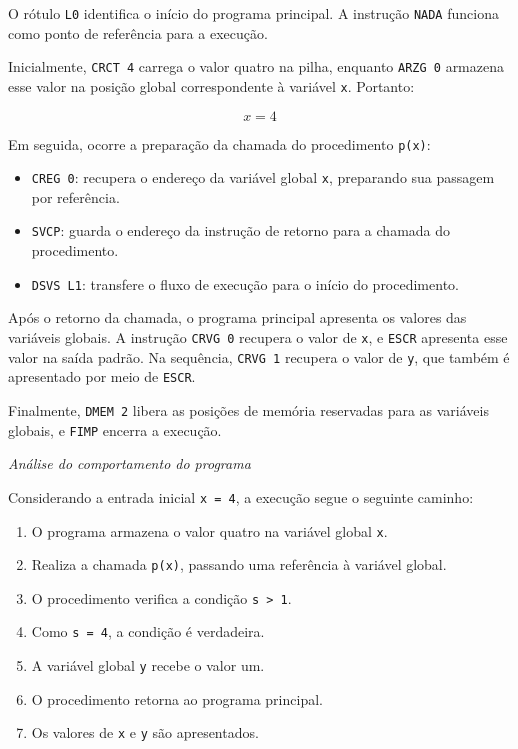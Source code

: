 \documentclass[
  brazilian,
  letterpaper,
]{book}
\providecommand{\tightlist}{%
  \setlength{\itemsep}{0pt}\setlength{\parskip}{0pt}}
\theoremstyle{plain}
\theoremstyle{definition}
\theoremstyle{remark}
\begin{document}
O rótulo \texttt{L0} identifica o início do programa principal. A
instrução \texttt{NADA} funciona como ponto de referência para a
execução.

Inicialmente, \texttt{CRCT\ 4} carrega o valor quatro na pilha, enquanto
\texttt{ARZG\ 0} armazena esse valor na posição global correspondente à
variável \texttt{x}. Portanto:

\[ x=4\]

Em seguida, ocorre a preparação da chamada do procedimento
\texttt{p(x)}:

\begin{itemize}
\tightlist
\item
  \texttt{CREG\ 0}: recupera o endereço da variável global \texttt{x},
  preparando sua passagem por referência.
\item
  \texttt{SVCP}: guarda o endereço da instrução de retorno para a
  chamada do procedimento.
\item
  \texttt{DSVS\ L1}: transfere o fluxo de execução para o início do
  procedimento.
\end{itemize}

Após o retorno da chamada, o programa principal apresenta os valores das
variáveis globais. A instrução \texttt{CRVG\ 0} recupera o valor de
\texttt{x}, e \texttt{ESCR} apresenta esse valor na saída padrão. Na
sequência, \texttt{CRVG\ 1} recupera o valor de \texttt{y}, que também é
apresentado por meio de \texttt{ESCR}.

Finalmente, \texttt{DMEM\ 2} libera as posições de memória reservadas
para as variáveis globais, e \texttt{FIMP} encerra a execução.

\emph{Análise do comportamento do programa}

Considerando a entrada inicial \texttt{x\ =\ 4}, a execução segue o
seguinte caminho:

\begin{enumerate}
\def\labelenumi{\arabic{enumi}.}
\tightlist
\item
  O programa armazena o valor quatro na variável global \texttt{x}.
\item
  Realiza a chamada \texttt{p(x)}, passando uma referência à variável
  global.
\item
  O procedimento verifica a condição \texttt{s\ \textgreater{}\ 1}.
\item
  Como \texttt{s\ =\ 4}, a condição é verdadeira.
\item
  A variável global \texttt{y} recebe o valor um.
\item
  O procedimento retorna ao programa principal.
\item
  Os valores de \texttt{x} e \texttt{y} são apresentados.
\end{enumerate}
\end{document}
